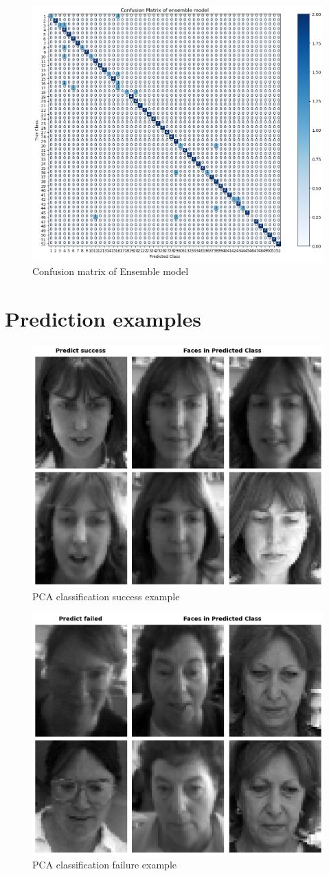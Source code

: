 \begin{figure}[htbp]
	\centering
	\includegraphics[width=0.4\linewidth]{image/q3_2_cm.png} %
	
	\caption{Confusion matrix of Ensemble model}
	\label{fig:q3_2_cm}
\end{figure}


\section{Prediction examples}
\begin{figure}[htbp]
	\centering
	\includegraphics[width=0.4\linewidth]{image/q1_success.png}
	
	\caption{PCA classification success example}
	\label{fig:q3_success}
\end{figure}

\begin{figure}[htbp]
	\centering
	\includegraphics[width=0.4\linewidth]{image/q1_fail.png}
	
	\caption{PCA classification failure example}
	\label{fig:q3_fail}
\end{figure}

